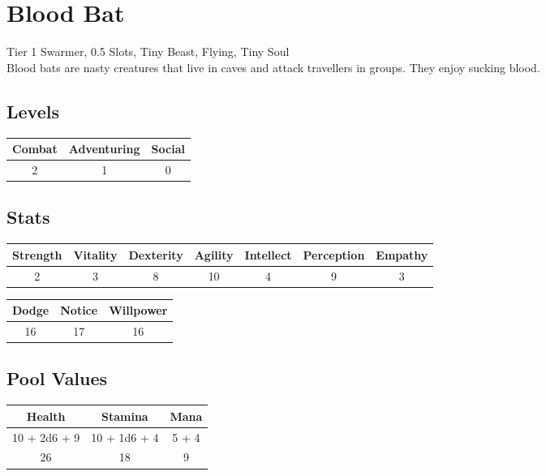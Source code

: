 \section{Blood Bat}\label{sec:bloodbat}
Tier 1 Swarmer, 0.5 Slots, Tiny Beast, Flying, Tiny Soul\\
Blood bats are nasty creatures that live in caves and attack travellers in groups.
They enjoy sucking blood.

\subsection{Levels}
\begin{minipage}[H]{1\textwidth}
	\centering
	\begin{tabular}[c]{|c | c | c|}
		\hline
		Combat & Adventuring & Social\\
		\hline
		2 & 1 & 0\\
		\hline
	\end{tabular}
\end{minipage}

\subsection{Stats}
\begin{minipage}[H]{1\textwidth}
	\centering
	\begin{tabular}[c]{|c | c | c | c | c | c | c|}
		\hline
		Strength & Vitality & Dexterity & Agility & Intellect & Perception & Empathy\\
		\hline
		2 & 3 & 8 & 10 & 4 & 9 & 3\\
		\hline
	\end{tabular}
\end{minipage}
\bigbreak

\begin{minipage}[H]{1\textwidth}
	\centering
	\begin{tabular}[c]{|c | c | c|}
		\hline
		Dodge & Notice & Willpower\\
		\hline
		16 & 17 & 16\\
		\hline
	\end{tabular}
\end{minipage}

\subsection{Pool Values}
\begin{minipage}[H]{1\textwidth}
	\centering
	\begin{tabular}[c]{|c | c | c|}
		\hline
		Health & Stamina & Mana\\
		\hline
		10 + 2d6 + 9 & 10 + 1d6 + 4 & 5 + 4 \\
		26 & 18 & 9\\
		\hline
	\end{tabular}
\end{minipage}
\noindent

